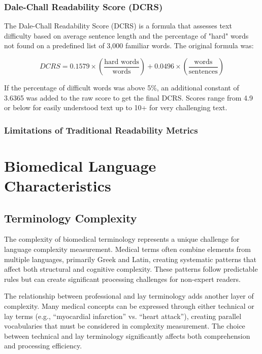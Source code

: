 \subsubsection{Dale-Chall Readability Score (DCRS)}

The Dale-Chall Readability Score (DCRS) is a formula that assesses text difficulty based on average sentence length and the percentage of "hard" words not found on a predefined list of 3,000 familiar words. The original formula was:

$$DCRS = 0.1579 \times \left(\frac{\text{hard words}}{\text{words}}\right) + 0.0496 \times \left(\frac{\text{words}}{\text{sentences}}\right)$$

If the percentage of difficult words was above 5\%, an additional constant of 3.6365 was added to the raw score to get the final DCRS. Scores range from 4.9 or below for easily understood text up to 10+ for very challenging text.

\subsubsection{Limitations of Traditional Readability Metrics}



\section{Biomedical Language Characteristics}

\subsection{Terminology Complexity}
The complexity of biomedical terminology represents a unique challenge for language complexity measurement. 
Medical terms often combine elements from multiple languages, primarily Greek and Latin, creating systematic patterns that affect both structural and cognitive complexity. 
These patterns follow predictable rules but can create significant processing challenges for non-expert readers.

The relationship between professional and lay terminology adds another layer of complexity. 
Many medical concepts can be expressed through either technical or lay terms (e.g., ``myocardial infarction'' vs. ``heart attack''), creating parallel vocabularies that must be considered in complexity measurement. 
The choice between technical and lay terminology significantly affects both comprehension and processing efficiency.